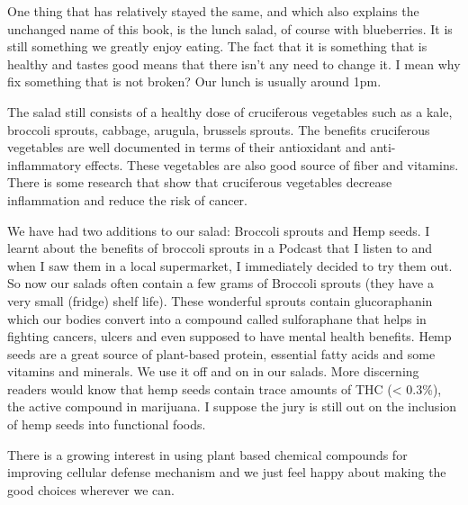 \documentclass[
  oneside]{book}
\begin{document}
One thing that has relatively stayed the same, and which also explains the unchanged name of this book, is the lunch salad, of course with blueberries. It is still something we greatly enjoy eating. The fact that it is something that is healthy and tastes good means that there isn't any need to change it. I mean why fix something that is not broken? Our lunch is usually around 1pm.

The salad still consists of a healthy dose of cruciferous vegetables such as a kale, broccoli sprouts, cabbage, arugula, brussels sprouts. The benefits cruciferous vegetables are well documented in terms of their antioxidant and anti-inflammatory effects. These vegetables are also good source of fiber and vitamins. There is some research that show that cruciferous vegetables decrease inflammation and reduce the risk of cancer.

We have had two additions to our salad: Broccoli sprouts and Hemp seeds. I learnt about the benefits of broccoli sprouts in a Podcast that I listen to and when I saw them in a local supermarket, I immediately decided to try them out. So now our salads often contain a few grams of Broccoli sprouts (they have a very small (fridge) shelf life). These wonderful sprouts contain glucoraphanin which our bodies convert into a compound called sulforaphane that helps in fighting cancers, ulcers and even supposed to have mental health benefits. Hemp seeds are a great source of plant-based protein, essential fatty acids and some vitamins and minerals. We use it off and on in our salads. More discerning readers would know that hemp seeds contain trace amounts of THC (\textless{} 0.3\%), the active compound in marijuana. I suppose the jury is still out on the inclusion of hemp seeds into functional foods.

There is a growing interest in using plant based chemical compounds for improving cellular defense mechanism and we just feel happy about making the good choices wherever we can.
\end{document}
